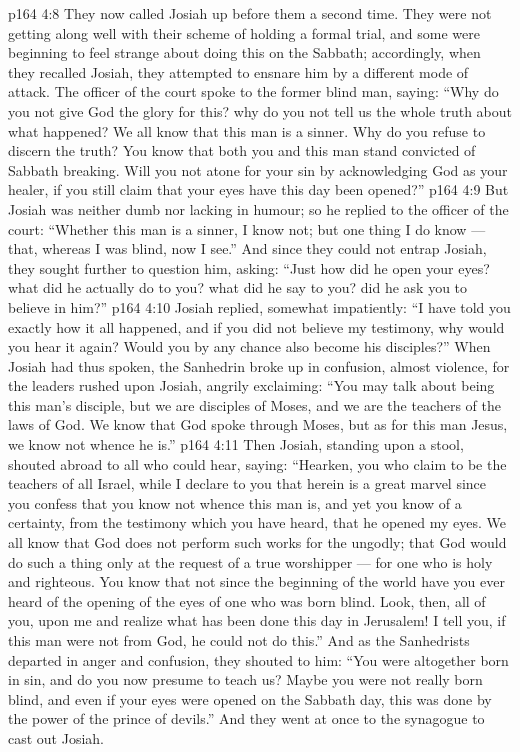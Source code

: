 \vs p164 4:8 They now called Josiah up before them a second time. They were not getting along well with their scheme of holding a formal trial, and some were beginning to feel strange about doing this on the Sabbath; accordingly, when they recalled Josiah, they attempted to ensnare him by a different mode of attack. The officer of the court spoke to the former blind man, saying: “Why do you not give God the glory for this? why do you not tell us the whole truth about what happened? We all know that this man is a sinner. Why do you refuse to discern the truth? You know that both you and this man stand convicted of Sabbath breaking. Will you not atone for your sin by acknowledging God as your healer, if you still claim that your eyes have this day been opened?”
\vs p164 4:9 But Josiah was neither dumb nor lacking in humour; so he replied to the officer of the court: “Whether this man is a sinner, I know not; but one thing I do know --- that, whereas I was blind, now I see.” And since they could not entrap Josiah, they sought further to question him, asking: “Just how did he open your eyes? what did he actually do to you? what did he say to you? did he ask you to believe in him?”
\vs p164 4:10 Josiah replied, somewhat impatiently: “I have told you exactly how it all happened, and if you did not believe my testimony, why would you hear it again? Would you by any chance also become his disciples?” When Josiah had thus spoken, the Sanhedrin broke up in confusion, almost violence, for the leaders rushed upon Josiah, angrily exclaiming: “You may talk about being this man’s disciple, but we are disciples of Moses, and we are the teachers of the laws of God. We know that God spoke through Moses, but as for this man Jesus, we know not whence he is.”
\vs p164 4:11 Then Josiah, standing upon a stool, shouted abroad to all who could hear, saying: “Hearken, you who claim to be the teachers of all Israel, while I declare to you that herein is a great marvel since you confess that you know not whence this man is, and yet you know of a certainty, from the testimony which you have heard, that he opened my eyes. We all know that God does not perform such works for the ungodly; that God would do such a thing only at the request of a true worshipper --- for one who is holy and righteous. You know that not since the beginning of the world have you ever heard of the opening of the eyes of one who was born blind. Look, then, all of you, upon me and realize what has been done this day in Jerusalem! I tell you, if this man were not from God, he could not do this.” And as the Sanhedrists departed in anger and confusion, they shouted to him: “You were altogether born in sin, and do you now presume to teach us? Maybe you were not really born blind, and even if your eyes were opened on the Sabbath day, this was done by the power of the prince of devils.” And they went at once to the synagogue to cast out Josiah.
